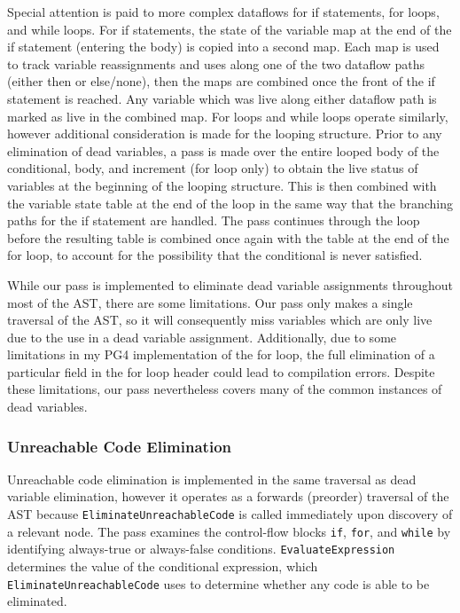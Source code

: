 \documentclass[sigconf]{acmart}
\begin{document}
Special attention is paid to more complex dataflows for if statements, for loops, and while loops. For if statements, the state of the variable map at the end of the if statement (entering the body) is copied into a second map. Each map is used to track variable reassignments and uses along one of the two dataflow paths (either then or else/none), then the maps are combined once the front of the if statement is reached. Any variable which was live along either dataflow path is marked as live in the combined map. For loops and while loops operate similarly, however additional consideration is made for the looping structure. Prior to any elimination of dead variables, a pass is made over the entire looped body of the conditional, body, and increment (for loop only) to obtain the live status of variables at the beginning of the looping structure. This is then combined with the variable state table at the end of the loop in the same way that the branching paths for the if statement are handled. The pass continues through the loop before the resulting table is combined once again with the table at the end of the for loop, to account for the possibility that the conditional is never satisfied.

While our pass is implemented to eliminate dead variable assignments throughout most of the AST, there are some limitations. Our pass only makes a single traversal of the AST, so it will consequently miss variables which are only live due to the use in a dead variable assignment. Additionally, due to some limitations in my PG4 implementation of the for loop, the full elimination of a particular field in the for loop header could lead to compilation errors. Despite these limitations, our pass nevertheless covers many of the common instances of dead variables.

\subsubsection{Unreachable Code Elimination}
Unreachable code elimination is implemented in the same traversal as dead variable elimination, however it operates as a forwards (preorder) traversal of the AST because \verb|EliminateUnreachableCode| is called immediately upon discovery of a relevant node. The pass examines the control-flow blocks \verb|if|, \verb|for|, and \verb|while| by identifying always-true or always-false conditions. \verb|EvaluateExpression| determines the value of the conditional expression, which \verb|EliminateUnreachableCode| uses to determine whether any code is able to be eliminated.
\end{document}
